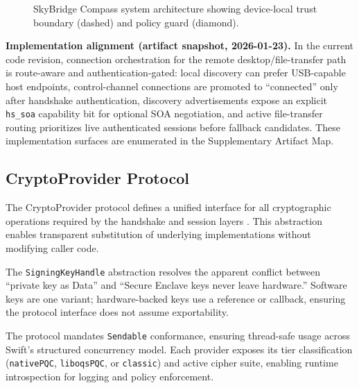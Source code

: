 \documentclass[10pt,journal,compsoc]{IEEEtran}
\begin{document}
\begin{figure}[!t]
\caption{SkyBridge Compass system architecture showing device-local trust
boundary (dashed) and policy guard (diamond).}
\label{fig:architecture}
\end{figure}

\textbf{Implementation alignment (artifact snapshot, 2026-01-23).} In the
current code revision, connection orchestration for the remote
desktop/file-transfer path is route-aware and authentication-gated:
local discovery can prefer USB-capable host endpoints, control-channel
connections are promoted to ``connected'' only after handshake
authentication, discovery advertisements expose an explicit
\texttt{hs\_soa} capability bit for optional SOA negotiation, and active
file-transfer routing prioritizes live
authenticated sessions before fallback candidates. These implementation
surfaces are enumerated in the Supplementary Artifact Map.

\subsection{CryptoProvider
Protocol}\label{b.-cryptoprovider-protocol}

The CryptoProvider protocol defines a unified interface for all
cryptographic operations required by the handshake and session layers \cite{ref37}.
This abstraction enables transparent substitution of underlying
implementations without modifying caller code.


The \texttt{SigningKeyHandle} abstraction resolves the apparent conflict
between ``private key as Data'' and ``Secure Enclave keys never leave
hardware.'' Software keys are one variant; hardware-backed keys use a
reference or callback, ensuring the protocol interface does not assume
exportability.

The protocol mandates \texttt{Sendable} conformance, ensuring
thread-safe usage across Swift's structured concurrency model. Each
provider exposes its tier classification (\texttt{nativePQC},
\texttt{liboqsPQC}, or \texttt{classic}) and active cipher suite,
enabling runtime introspection for logging and policy enforcement.
\end{document}
